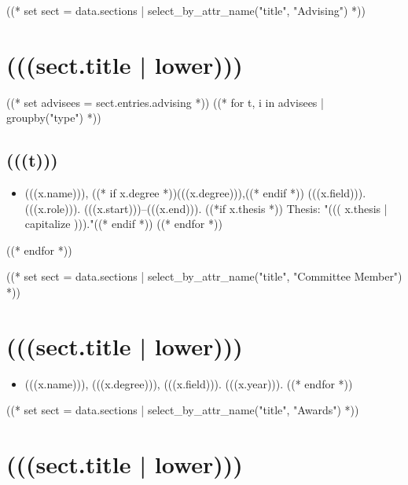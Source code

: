 \documentclass[11pt,article,oneside]{memoir}
\begin{document}
((* set sect = data.sections | select_by_attr_name("title", "Advising") *))
\section{(((sect.title | lower)))}

\mbox{}\vspace{-\dimexpr\baselineskip\relax}

\vspace{\baselineskip}
((* set advisees = sect.entries.advising *))
((* for t, i in advisees | groupby("type") *))
\subsection{(((t)))}
\begin{itemize}[label={}]
((* for x in i | sort_by_attr(["end", "start"], reverse=True) *))
\item (((x.name))), ((* if x.degree *))(((x.degree))),((* endif *)) (((x.field))). (((x.role))). (((x.start)))--(((x.end))). ((*if x.thesis *)) Thesis: "((( x.thesis | capitalize )))."((* endif *))
((* endfor *))
\end{itemize}
((* endfor *))

((* set sect = data.sections | select_by_attr_name("title", "Committee Member") *))
\section{(((sect.title | lower)))}

\mbox{}\vspace{-\dimexpr\baselineskip\relax}

\vspace{\baselineskip}
\begin{itemize}[label={}]
((* for x in sect.entries.member | sort_by_attr(["year"], reverse=True) *))
\item (((x.name))), (((x.degree))), (((x.field))). (((x.year))).
((* endfor *))
\end{itemize}


((* set sect = data.sections | select_by_attr_name("title", "Awards") *))
\section{(((sect.title | lower)))}

\mbox{}\vspace{-\dimexpr\baselineskip\relax}
\end{document}
